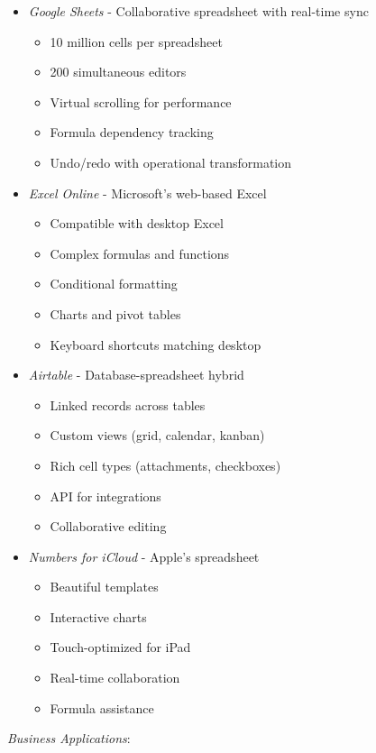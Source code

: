 \documentclass[11pt]{article}
\begin{document}
\begin{itemize}
\item \emph{Google Sheets} - Collaborative spreadsheet with real-time sync
\begin{itemize}
\item 10 million cells per spreadsheet
\item 200 simultaneous editors
\item Virtual scrolling for performance
\item Formula dependency tracking
\item Undo/redo with operational transformation
\end{itemize}

\item \emph{Excel Online} - Microsoft's web-based Excel
\begin{itemize}
\item Compatible with desktop Excel
\item Complex formulas and functions
\item Conditional formatting
\item Charts and pivot tables
\item Keyboard shortcuts matching desktop
\end{itemize}

\item \emph{Airtable} - Database-spreadsheet hybrid
\begin{itemize}
\item Linked records across tables
\item Custom views (grid, calendar, kanban)
\item Rich cell types (attachments, checkboxes)
\item API for integrations
\item Collaborative editing
\end{itemize}

\item \emph{Numbers for iCloud} - Apple's spreadsheet
\begin{itemize}
\item Beautiful templates
\item Interactive charts
\item Touch-optimized for iPad
\item Real-time collaboration
\item Formula assistance
\end{itemize}
\end{itemize}

\emph{Business Applications}:
\end{document}
